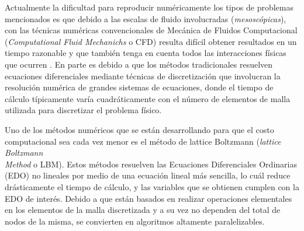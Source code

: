 
%
%

Actualmente la dificultad para reproducir numéricamente los tipos de problemas mencionados es que debido a las escalas de fluido involucradas (\textit{mesoscópicas}), con las técnicas numéricas convencionales de Mecánica de Fluidos Computacional (\textit{Computational Fluid Mechanichs} o CFD) resulta difícil obtener resultados en un tiempo razonable y que también tenga en cuenta todos las interacciones físicas que ocurren \cite{guo2013lattice}. En parte es debido a que los métodos tradicionales resuelven ecuaciones diferenciales mediante técnicas de discretización que involucran la resolución numérica de grandes sistemas de ecuaciones, donde el tiempo de cálculo típicamente varía cuadráticamente con el número de elementos de malla utilizada para discretizar el problema físico.

Uno de los métodos numéricos que se están desarrollando para que el costo computacional sea cada vez menor es el método de lattice Boltzmann (\textit{lattice Boltzmann \\
Method} o LBM). Estos métodos resuelven las Ecuaciones Diferenciales Ordinarias (EDO) no lineales por medio de una ecuación lineal más sencilla, lo cuál reduce drásticamente el tiempo de cálculo, y las variables que se obtienen cumplen con la EDO de interés. Debido a que están basados en realizar operaciones elementales en los elementos de la malla discretizada y a su vez no dependen del total de nodos de la misma, se convierten en algoritmos altamente paralelizables.


